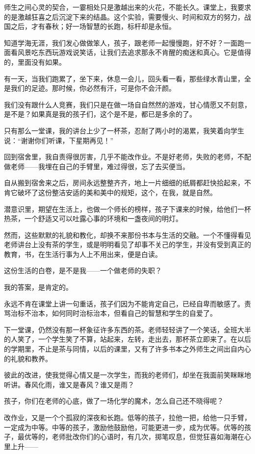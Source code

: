 \par 师生之间心灵的契合，一霎相处只是激越出来的火花，不能长久。课堂上，我要求的是激越狂喜之后沉淀下来的结晶。这个实验，需要慢火、时间和双方的努力，战国之后，才有春秋；好一场智慧的长跑，标杆却是永恒。
\par 知道学海无涯，我们发心做做笨人，孩子，跟老师一起慢慢跑，好不好？一面跑一面看风景吃东西玩游戏说笑话，让我们去追求那永不肯醒的痴迷和真心。它是值得的，里面没有如果。
\par 有一天，当我们跑累了，坐下来，休息一会儿，回头看一看，那些绿水青山里，全是我们的足迹。那时候，你必然有汗，可是你不会汗颜。
\par 我们没有跟什么人竞赛，我们只是在做一场自自然然的游戏，甘心情愿又不刻意，是不是？如果真是我的孩子们，这个是不是，都已是多余的了。
\par 只有那么一堂课，我的讲台上少了一杯茶，忍耐了两小时的渴累，我笑着向学生说：“谢谢你们听课，下星期再见！”
\par 回到宿舍里，我自责得很厉害，几乎不能改作业。不是好老师，失败的老师，不配做老师——我埋在自己的手臂里，难过得很，忘了去买便当。
\par 自从搬到宿舍来之后，房间永远整整齐齐，地上一片细细的纸屑都赶快拾起来，不肯它破坏了这份整洁安适的美和美中的规矩，这个，在我，就是自然。
\par 潜意识里，期望在生活上，也做一个师长的榜样，孩子下课来的时候，给他们一杯热茶，一个舒适又可以吐露心事的环境和一盏夜间的明灯。
\par 然而，这些默默的礼貌和教化，却换不来那份书本与生活的交融。一个不懂得看见老师讲台上没有茶的学生，或是明明看见了却事不关己的学生，并没有受到真正的教育，书，在生活行事为人上不用出来，便是白读。
\par 这份生活的白卷，是不是我——一个做老师的失职？
\par 我的答案，是肯定的。
\par 永远不肯在课堂上讲一句重话，孩子们因为不能肯定自己，已经自卑而敏感了。责骂治标不治本，如何同时治标治本，但看自己的智慧和学生的自爱了。
\par 下一堂课，仍然没有那一杯象征许多东西的茶。老师轻轻讲了一个笑话，全班大半的人笑了，一个学生笑了不算，站起来，左转，走出去，那杯茶立即来了。在以后的学期里，不止是茶与同情，以后的课里，又有了许多书本之外师生之间出自内心的礼貌和教养。
\par 彼此的改进，使我觉得心情又是一次学生，而我的老师们，却坐在我面前笑眯眯地听讲。春风化雨，谁又是春风？谁又是雨？
\par 孩子，你们在老师的心底，做了一场化学的魔术，怎么自己还不晓得呢？
\par 改作业，又是一个个孤寂的深夜和长跑。低等的孩子，拉他一把，给他一只手臂，一定成为中等。中等的孩子，激励他鼓励他，可能更进一步，成为优等。优等的孩子，最优等的，老师批改你们的心语时，有几次，掷笔叹息，但觉狂喜如海潮在心里上升——

